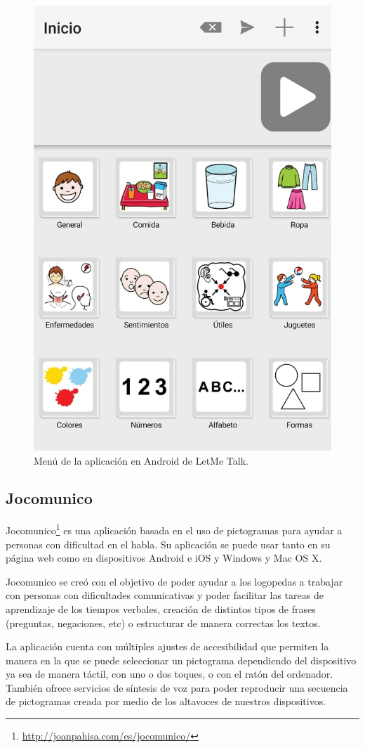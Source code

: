 \begin{figure}[h!]
	\centering
	\includegraphics[width=0.7\linewidth]{Imagenes/Bitmap/LetMeTalk}
	\caption{Menú de la aplicación en Android de LetMe Talk.}
	\label{fig:letmetalk}
\end{figure}

\newpage

\subsection{Jocomunico}
Jocomunico\footnote{\url{http://joanpahisa.com/es/jocomunico/}} es una aplicación basada en el uso de pictogramas para ayudar a personas con dificultad en el habla. Su aplicación se puede usar tanto en su página web como en dispositivos Android e iOS y Windows y Mac OS X.

Jocomunico se creó con el objetivo de poder ayudar a los logopedas a trabajar con personas con dificultades comunicativas y poder facilitar las tareas de aprendizaje de los tiempos verbales, creación de distintos tipos de frases (preguntas, negaciones, etc) o estructurar de manera correctas los textos.

La aplicación cuenta con múltiples ajustes de accesibilidad que permiten la manera en la que se puede seleccionar un pictograma dependiendo del dispositivo ya sea de manera táctil, con uno o dos toques, o con el ratón del ordenador. También ofrece servicios de síntesis de voz para poder reproducir una secuencia de pictogramas creada por medio de los altavoces de nuestros dispositivos.

